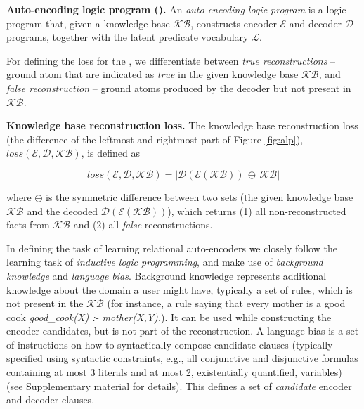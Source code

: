 \begin{definition}
\textbf{Auto-encoding logic program (\alp{}).}
An \textit{auto-encoding logic program} is a logic program that, given a knowledge base $\mathcal{KB}$, constructs encoder $\mathcal{E}$ and decoder $\mathcal{D}$ programs, together with the latent predicate vocabulary $\mathcal{L}$.
\end{definition}


For defining the loss for the , we differentiate between \textit{true reconstructions} -- ground atom that are indicated as \textit{true} in the given knowledge base $\mathcal{KB}$, and \textit{false reconstruction} -- ground atoms produced by the decoder but not present in $\mathcal{KB}$.

\begin{definition}
\textbf{Knowledge base reconstruction loss.}
The knowledge base reconstruction loss (the difference of the leftmost and rightmost part of Figure \ref{fig:alp}), $loss(\mathcal{E}, \mathcal{D}, \mathcal{KB})$, is defined as

\begin{equation}
    loss(\mathcal{E},\mathcal{D},\mathcal{KB}) = | \mathcal{D}(\mathcal{E}(\mathcal{KB})) \, \ominus \, \mathcal{KB} |
    \label{eq:reconstruction}
\end{equation}


where $\ominus$ is the symmetric difference between two sets (the given knowledge base $\mathcal{KB}$ and the decoded $\mathcal{D}(\mathcal{E}(\mathcal{KB}))$), which returns (1) all non-reconstructed facts from $\mathcal{KB}$ and (2)  all \textit{false} reconstructions.
\end{definition}



In defining the task of learning relational auto-encoders we closely follow the learning task of \textit{inductive logic programming}, and make use of \textit{background knowledge} and \textit{language bias}.
Background knowledge represents additional knowledge about the domain a user might have, typically a set of rules, which is not present in the $\mathcal{KB}$ (for instance, a rule saying that every mother is a good cook \textit{good\_cook(X) :- mother(X,Y).}).
It can be used while constructing the encoder candidates, but is not part of the reconstruction.
A language bias is a set of instructions on how to syntactically compose candidate clauses (typically specified using syntactic constraints, e.g., all conjunctive and disjunctive formulas containing at most 3 literals and at most 2, existentially quantified, variables) (see Supplementary material for details).
This defines a set of \textit{candidate} encoder and decoder clauses.



